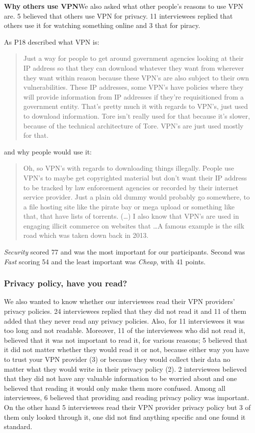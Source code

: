 \textbf{Why others use VPN}We also asked what other people's reasons to use
VPN are. 5 believed that others use VPN for privacy. 11 interviewees replied
that others use it for watching something online and 3 that for piracy.

As P18 described what VPN is: \begin{quote} Just a way for people to get
around government agencies looking at their IP address so that they can
download whatever they want from wherever they want within reason because
these VPN's are also subject to their own vulnerabilities. These IP addresses,
some VPN's have policies where they will provide information from IP addresses
if they're requisitioned from a government entity. That's pretty much it with
regards to VPN's, just used to download information. Tore isn't really used
for that because it's slower, because of the technical architecture of Tore.
VPN's are just used mostly for that.\end{quote}

and why people would use it: \begin{quote}Oh, so VPN's with regards to
downloading things illegally. People use VPN's to maybe get copyrighted
material but don't want their IP address to be tracked by law enforcement
agencies or recorded by their internet service provider. Just a plain old
dummy would probably go somewhere, to a file hosting site like the pirate bay
or mega upload or something like that, that have lists of torrents. (\dots) I
also know that VPN's are used in engaging illicit commerce on websites that
\dots A famous example is the silk road which was taken down back in 2013.
\end{quote}



 \textit{Security} scored 77 and was the most important for
our participants. Second was \textit{Fast} scoring 54 and the least important
was \textit{Cheap}, with 41 points.


\subsubsection{Privacy policy, have you read?} We also wanted to know whether
our interviewees read their VPN providers’ privacy policies. 24 interviewees
replied that they did not read it and 11 of them added that they never read
any privacy policies. Also, for 11 interviewees it was too long and not
readable. Moreover, 11 of the interviewees who did not read it, believed that
it was not important to read it, for various reasons; 5 believed that it did
not matter whether they would read it or not, because either way you have to
trust your VPN provider (3) or because they would collect their data no matter
what they would write in their privacy policy (2). 2 interviewees believed
that they did not have any valuable information to be worried about and one
believed that reading it would only make them more confused. Among all
interviewees, 6 believed that providing and reading privacy policy was
important. On the other hand 5 interviewees read their VPN provider privacy
policy but 3 of them only looked through it, one did not find anything
specific and one found it standard. 

